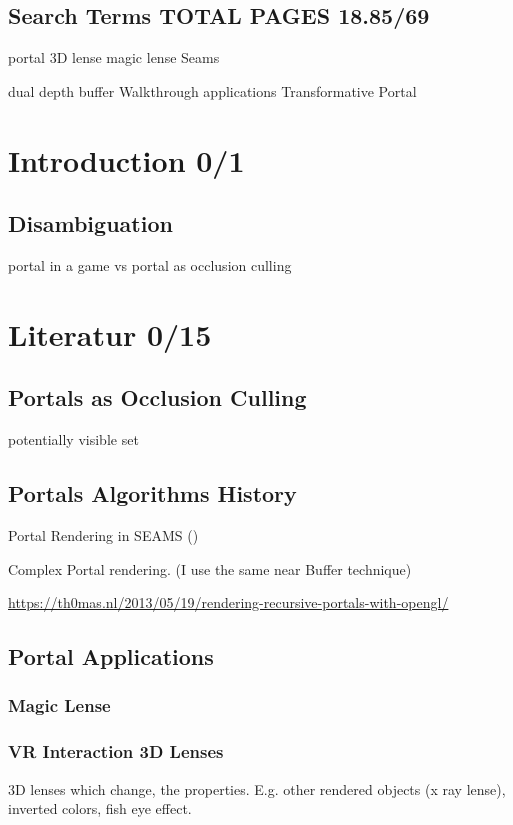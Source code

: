 
\subsection*{Search Terms TOTAL PAGES 18.85/69}
portal
3D lense
magic lense
Seams

dual depth buffer
Walkthrough applications
Transformative Portal
\section{Introduction 0/1}

\subsection{Disambiguation}
portal in a game
vs
portal as occlusion culling

\section{Literatur 0/15}

\subsection{Portals as Occlusion Culling}
potentially visible set
\cite{luebke:1995:portals}
\cite{yang:2014:walkthrough}

\subsection{Portals Algorithms History}


Portal Rendering in SEAMS (\cite{schmalstieg:1999:sewing})

Complex Portal rendering. (I use the same near Buffer technique) \cite{ lowe:2005:technique}


\url{https://th0mas.nl/2013/05/19/rendering-recursive-portals-with-opengl/}
\subsection{Portal Applications}

\subsubsection{Magic Lense}
\cite{viega:1996:3d}


\subsubsection{VR Interaction 3D Lenses}
\cite{borst:2009:real}
3D lenses which change, the properties. E.g. other rendered objects (x ray lense), inverted colors, fish eye effect.

